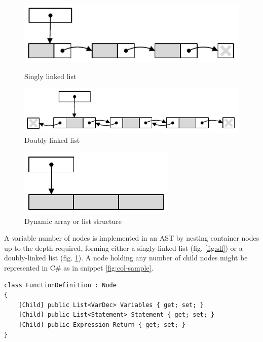 \documentclass[twoside,openright]{uva-bachelor-thesis}
\begin{document}
		\begin{figure}[ht]
			\begin{minipage}[b]{0.45\linewidth}
				\centering
				\includegraphics[width=\textwidth]{figures/collections/sll}
				\caption{Singly linked list}
				\label{fig:sll}
			\end{minipage}
			\hspace{0.5cm}
			\begin{minipage}[b]{0.45\linewidth}
				\centering
				\includegraphics[width=\textwidth]{figures/collections/dll}
				\caption{Doubly linked list}
				\label{fig:dll}
			\end{minipage}
		\end{figure}
		\begin{figure}[h]
			\centering
			\includegraphics{figures/collections/list}
			\caption{Dynamic array or list structure}
			\label{fig:list}
		\end{figure}
		
		A variable number of nodes is implemented in an AST by nesting container nodes up to the depth required, forming either a singly-linked list (fig. \ref{fig:sll}) or a doubly-linked list (fig. \ref{fig:dll}). A node holding any number of child nodes might be represented in C\# as in snippet \ref{fig:col-sample}.
		
		\begin{lstlisting}[caption=Example of list attributes in a function definition,label=fig:col-sample]
class FunctionDefinition : Node 
{
	[Child] public List<VarDec> Variables { get; set; }
	[Child] public List<Statement> Statement { get; set; }
	[Child] public Expression Return { get; set; }
}
		\end{lstlisting}
	
\end{document}
